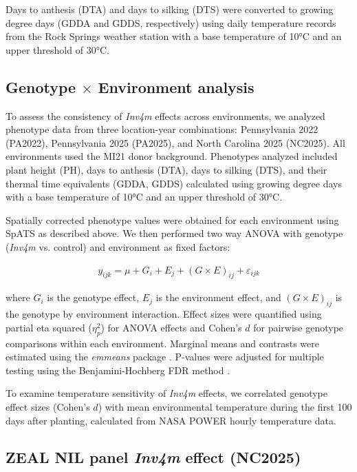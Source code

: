 \documentclass[9pt,twocolumn,twoside]{rilabRxiv}
\newcommand{\invfour}{\textit{Inv4m}\xspace}
\begin{document}
Days to anthesis (DTA) and days to silking (DTS) were converted to growing degree days (GDDA and GDDS, respectively) using daily temperature records from the Rock Springs weather station with a base temperature of 10°C and an upper threshold of 30°C.

\subsection{Genotype $\times$ Environment analysis}

To assess the consistency of \invfour effects across environments, we analyzed phenotype data from three location-year combinations: Pennsylvania 2022 (PA2022), Pennsylvania 2025 (PA2025), and North Carolina 2025 (NC2025).
All environments used the MI21 donor background.
Phenotypes analyzed included plant height (PH), days to anthesis (DTA), days to silking (DTS), and their thermal time equivalents (GDDA, GDDS) calculated using growing degree days with a base temperature of 10°C and an upper threshold of 30°C.

Spatially corrected phenotype values were obtained for each environment using SpATS as described above.
We then performed two way ANOVA with genotype (\invfour vs. control) and environment as fixed factors:

\begin{eqnarray}
\label{eq:gxe_model}
y_{ijk} = \mu + G_i + E_j + (G \times E)_{ij} + \varepsilon_{ijk}
\end{eqnarray}

where $G_i$ is the genotype effect, $E_j$ is the environment effect, and $(G \times E)_{ij}$ is the genotype by environment interaction.
Effect sizes were quantified using partial eta squared ($\eta^2_p$) for ANOVA effects and Cohen's $d$ for pairwise genotype comparisons within each environment.
Marginal means and contrasts were estimated using the \textit{emmeans} package \cite{lenth2025}.
P-values were adjusted for multiple testing using the Benjamini-Hochberg FDR method \cite{benjamini1995}.

To examine temperature sensitivity of \invfour effects, we correlated genotype effect sizes (Cohen's $d$) with mean environmental temperature during the first 100 days after planting, calculated from NASA POWER hourly temperature data.

\subsection{ZEAL NIL panel \invfour effect (NC2025)}
\end{document}
